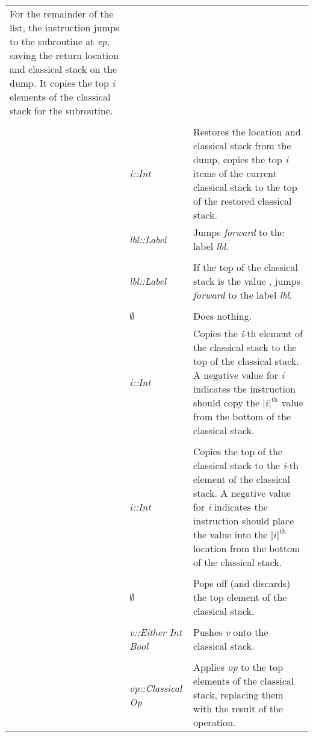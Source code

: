 {\begin{singlespace}
\begin{supertabular}{|p{.8in}|p{1.2in}|p{3.5in}|}
For the remainder of the list, the instruction jumps to the 
subroutine at \emph{ep}, saving
the return location and classical stack on the dump. It copies the
top \emph{i} elements of the classical stack for the subroutine.\\ & & \\
&\emph{i::Int}&Restores the location and classical stack from the
dump, copies the top \emph{i} items of the current classical stack to the
top of the restored classical stack.\\
\hline
{}&\emph{lbl::Label}&Jumps \emph{forward} to the label \emph{lbl}.\\ & & \\
&\emph{lbl::Label}&If the top of the classical stack is the
value , jumps \emph{forward} to the label \emph{lbl}.\\ & & \\
&$\emptyset$&Does nothing.\\
\hline
{}&\emph{i::Int}&Copies the \emph{i}-th element of the 
classical stack to the
top of the classical stack. A negative value for \emph{i} indicates the
instruction should copy the $|i|^{\text{th}}$ value from the
bottom of the classical stack.\\ & & \\
&\emph{i::Int}&Copies the top of the classical stack to the 
\emph{i}-th element of the classical stack.  A negative value for 
\emph{i} indicates the
instruction should place the value into the $|i|^{\text{th}}$ location
 from the
bottom of the classical stack.\\ & & \\
&$\emptyset$&Pops off (and discards) the top element of 
the classical stack.\\ & & \\
&\emph{v::Either Int Bool}&Pushes \emph{v} onto the classical stack.\\ & & \\
&\emph{op::Classical Op}&Applies \emph{op} to the top elements of
the classical stack, replacing them with the result of the operation.\\
\end{supertabular}
\end{singlespace}
}
